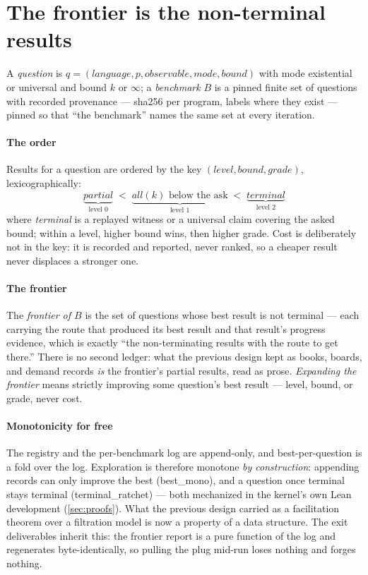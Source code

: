
\section{The frontier is the non-terminal results}
\label{sec:map}

A \emph{question} is
$q = (\textit{language}, p, \textit{observable}, \textit{mode},
\textit{bound})$ with mode existential or universal and bound
$k$ or $\infty$; a \emph{benchmark} $B$ is a pinned finite set of
questions with recorded provenance --- sha256 per program, labels
where they exist --- pinned so that ``the benchmark'' names the same
set at every iteration.

\paragraph{The order}
Results for a question are ordered by the key
$(\textit{level}, \textit{bound}, \textit{grade})$,
lexicographically:
\[
\underbrace{\textit{partial}}_{\text{level } 0}
\;<\;
\underbrace{\textit{all}(k) \text{ below the ask}}_{\text{level } 1}
\;<\;
\underbrace{\textit{terminal}}_{\text{level } 2}
\]
where \emph{terminal} is a replayed witness or a universal claim
covering the asked bound; within a level, higher bound wins, then
higher grade. Cost is deliberately not in the key: it is recorded
and reported, never ranked, so a cheaper result never displaces a
stronger one.

\paragraph{The frontier}
The \emph{frontier of $B$} is the set of questions whose best result
is not terminal --- each carrying the route that produced its best
result and that result's progress evidence, which is exactly ``the
non-terminating results with the route to get there.'' There is no
second ledger: what the previous design kept as books, boards, and
demand records \emph{is} the frontier's partial results, read as
prose. \emph{Expanding the frontier} means strictly improving some
question's best result --- level, bound, or grade, never cost.

\paragraph{Monotonicity for free}
The registry and the per-benchmark log are append-only, and
best-per-question is a fold over the log. Exploration is therefore
monotone \emph{by construction}: appending records can only improve
the best (\textsf{best\_mono}), and a question once terminal stays
terminal (\textsf{terminal\_ratchet}) --- both mechanized in the
kernel's own Lean development (\cref{sec:proofs}). What the previous
design carried as a facilitation theorem over a filtration model is
now a property of a data structure. The exit deliverables inherit
this: the frontier report is a pure function of the log and
regenerates byte-identically, so pulling the plug mid-run loses
nothing and forges nothing.
